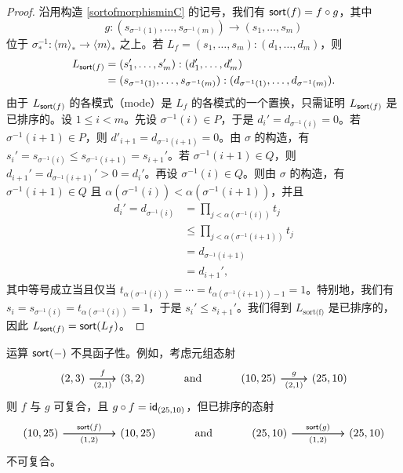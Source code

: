\begin{proof}
    沿用构造 \ref{sortofmorphisminC} 的记号，我们有 $\mathsf{sort}(f) = f \circ g$，其中
    \[
    g : (s_{\sigma^{-1}(1)},\dots,s_{\sigma^{-1}(m)}) \to (s_1,\dots,s_m)
    \]
    位于 $\sigma^{-1}_*: \langle m \rangle_* \to \langle m \rangle_*$ 之上。若 $L_f = (s_1,\dots,s_m):(d_1,\dots,d_m)$，则
    \begin{align*}
    L_{\mathsf{sort}(f)} & = (s_1',\dots,s_m'):(d_1',\dots,d_m') \\
    & = (s_{\sigma^{-1}(1)},\dots,s_{\sigma^{-1}(m)}):(d_{\sigma^{-1}(1)},\dots,d_{\sigma^{-1}(m)}).
    \end{align*}
    由于 $L_{\mathsf{sort}(f)}$ 的各模式（mode）是 $L_f$ 的各模式的一个置换，只需证明 $L_{\mathsf{sort}(f)}$ 是已排序的。设 $1 \leq i <m$。先设 $\sigma^{-1}(i) \in P$，于是 $d_i' = d_{\sigma^{-1}(i)} = 0$。若 $\sigma^{-1}(i+1) \in P$，则 $d'_{i+1} = d_{\sigma^{-1}(i+1)} = 0$。由 $\sigma$ 的构造，有 $s_i' = s_{\sigma^{-1}(i)} \leq s_{\sigma^{-1}(i+1)} = s_{i+1}'$。若 $\sigma^{-1}(i+1) \in Q$，则 $d_{i+1}' = d_{\sigma^{-1}(i+1)}' > 0 = d_i'$。再设 $\sigma^{-1}(i) \in Q$。则由 $\sigma$ 的构造，有 $\sigma^{-1}(i+1) \in Q$ 且 $\alpha(\sigma^{-1}(i)) < \alpha(\sigma^{-1}(i+1))$，并且
    \begin{align*}
    d_i' = d_{\sigma^{-1}(i)} & = \prod_{j < \alpha(\sigma^{-1}(i))} t_j \\
    & \leq \prod_{j<\alpha(\sigma^{-1}(i+1))} t_j \\
    & = d_{\sigma^{-1}(i+1)}\\
    & = d_{i+1}',
    \end{align*}
    其中等号成立当且仅当 $t_{\alpha(\sigma^{-1}(i))} =  \cdots = t_{\alpha(\sigma^{-1}(i+1))-1} = 1$。特别地，我们有 $s_i = s_{\sigma^{-1}(i)} = t_{\alpha(\sigma^{-1}(i))} = 1$，于是 $s_i' \leq s_{i+1}'$。我们得到 $L_{\text{sort(f)}}$ 是已排序的，因此 $L_{\mathsf{sort}(f)} = \mathsf{sort}(L_f)$。
\end{proof}

\begin{remark}
    运算 $\mathsf{sort}(-)$ 不具函子性。例如，考虑元组态射
    \[ \begin{tikzcd} (2,3)\ar[r,"f"] \ar[r,swap,"(2{,}1)"] & (3,2) & \text{ and } & (10,25)\ar[r,"g"] \ar[r,swap,"(2{,}1)"] & (25,10)\end{tikzcd} \]
    则 $f$ 与 $g$ 可复合，且 $g \circ f = \mathsf{id}_{(25,10)}$，但已排序的态射
    \[ \begin{tikzcd} (10,25)\ar[rr,"\sort(f)"] \ar[rr,swap,"(1{,}2)"] & & (10,25) & \text{ and } & (25,10)\ar[rr,"\sort(g)"] \ar[rr,swap,"(1{,}2)"] & & (25,10)\end{tikzcd} \]
    不可复合。
\end{remark}

